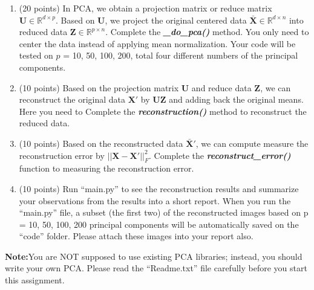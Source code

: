\documentclass[11pt]{article}
\begin{document}
\begin{enumerate}
    \begin{enumerate}
    \item (20 points) In PCA, we obtain a projection matrix or
    reduce matrix $\boldsymbol U \in \mathbb{R}^{d\times p}$.
    Based on $\boldsymbol U$, we project the original centered
    data $\boldsymbol{\bar{X}} \in \mathbb{R}^{d\times n}$ into
    reduced data $\boldsymbol{Z} \in \mathbb{R}^{p\times n}$.
    Complete the \emph{\textbf{\_do\_pca()}} method. You only
    need to center the data instead of applying mean
    normalization. Your code will be tested on $p$ = 10, 50, 100,
    200, total four different numbers of the principal
    components.
    
    \item (10 points) Based on the projection matrix $\boldsymbol
    U$ and reduce data $\boldsymbol{Z}$, we can reconstruct the
    original data  $\boldsymbol{{X}'}$ by $\boldsymbol{U}
    \boldsymbol{Z}$ and adding back the original means. Here you
    need to  Complete the \emph{\textbf{reconstruction()}} method
    to reconstruct the reduced data.
    
    \item (10 points) Based on the reconstructed data
    $\boldsymbol{\bar{X}'}$, we can compute measure the
    reconstruction error by $||\boldsymbol X -
    \boldsymbol{{X}'}||^2_F$. Complete the
    \emph{\textbf{reconstruct\_error()}} function to measuring
    the reconstruction error.
    
    \item (10 points) Run ``main.py'' to see the reconstruction
    results and summarize your observations from the results into
    a short report. When you run the ``main.py'' file, a subset
    (the first two) of the reconstructed images based on p = 10,
    50, 100, 200 principal components will be automatically saved
    on the ``code'' folder. Please attach these images into your
    report also.
    \end{enumerate}
    
    
    \textbf{Note:}You are NOT supposed to use existing PCA libraries; instead, you should write your own PCA. Please read the ``Readme.txt'' file carefully before you start this assignment.

\end{enumerate}
\end{document}
